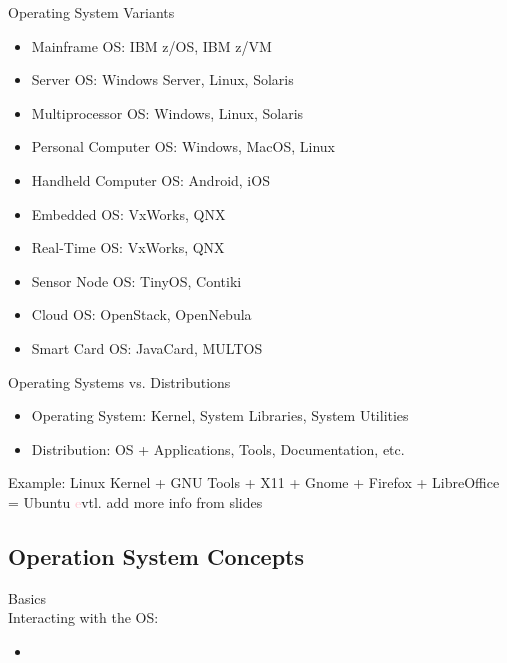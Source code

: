 \begin{theorem}{Operating System Variants}
    \begin{itemize}
        \item Mainframe OS: IBM z/OS, IBM z/VM
        \item Server OS: Windows Server, Linux, Solaris
        \item Multiprocessor OS: Windows, Linux, Solaris
        \item Personal Computer OS: Windows, MacOS, Linux
        \item Handheld Computer OS: Android, iOS
        \item Embedded OS: VxWorks, QNX
        \item Real-Time OS: VxWorks, QNX
        \item Sensor Node OS: TinyOS, Contiki
        \item Cloud OS: OpenStack, OpenNebula
        \item Smart Card OS: JavaCard, MULTOS
    \end{itemize}
\end{theorem}

\begin{corollary}{Operating Systems vs. Distributions}
    \begin{itemize}
        \item Operating System: Kernel, System Libraries, System Utilities
        \item Distribution: OS + Applications, Tools, Documentation, etc.
    \end{itemize}
    Example: Linux Kernel + GNU Tools + X11 + Gnome + Firefox + LibreOffice = Ubuntu
    \textcolor{pink} evtl. add more info from slides
\end{corollary}

\subsection{Operation System Concepts}

\begin{concept}{Basics}\\
    Interacting with the OS:
    \begin{itemize}
        \item 
    \end{itemize}
    
\end{concept}